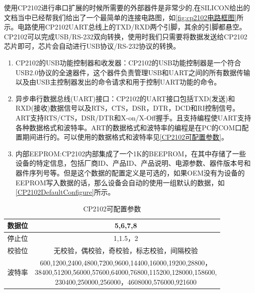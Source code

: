 	使用CP2102进行串口扩展的时候所需要的外部器件是非常少的,在SILICON给出的文档当中已经帮我们给出了一个最简单的连接电路图，如\autoref{fig:cp2102电路框图}所示。电路使用CP2102UART总线上的TXD/RXD两个引脚，其余的引脚都悬空。CP2102可以完成USB/RS-232双向转换，使用时我们只需要将数据发送给CP2102芯片即可，芯片会自动进行USB协议/RS-232协议的转换。
		
\begin{enumerate}
\item CP2102的USB功能控制器和收发器：CP2102的USB功能控制器是一个符合USB2.0协议的全速器件，这个器件负责管理USB和UART之间的所有数据传输以及由USB主控制器发出的命令请求和用于控制UART功能的命令。
\item 异步串行数据总线(UART)接口：CP2102的UART接口包括TXD(发送)和RXD(接收)数据信号以及RTS，CTS，DSR，DTR，DCD和RI控制信号。ART支持RTS/CTS，DSR/DTR和X-on/X-Off握手。且支持编程使UART支持各种数据格式和波特率。ART的数据格式和波特率的编程是在PC的COM口配置期间进行的。可以使用的数据格式和波特率见\autoref{CP2102可配置参数}。
\item 内部EEPROM:CP2102内部集成了一个1K的BEEPROM，在其中存储了一些设备的特定信息，包括厂商ID、产品ID、产品说明、电源参数、器件版本号和器件序列号等\cite{CP2102}。但是这个数据的配置定义是可选的，如果OEM没有为设备的EEPROM写入数据的话，那么设备会自动的使用一组默认的数据，如\autoref{CP2102DefaultConfigure}所示。
\end{enumerate}

\begin{table}[!h]
\centering
\begin{tabular}{|c|c|}
\hline
{数据位} & {5,6,7,8} \\
\hline
{停止位} & {1,1.5，2} \\
\hline
{校验位} & {无校验，偶校验，奇校验，标志校验，间隔校验} \\
\hline
{波特率} & \tabincell{c}{600,1200,2400,4800,7200,9600,14400,16000,19200,28800，\\ 38400,51200,56000,57600,64000,76800,115200,128000,158600,\\ 230400,250000,256000，4608000,576000,921600}\\
\hline
\end{tabular} 
\caption{CP2102可配置参数}\label{CP2102可配置参数}
\end{table}

